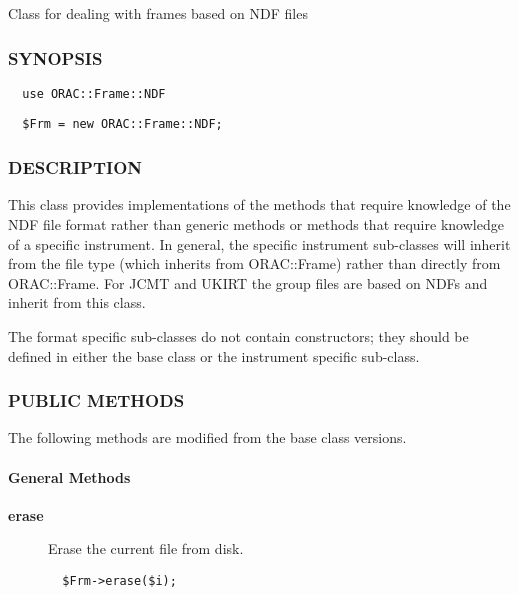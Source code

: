 \begin{description}
Class for dealing with frames based on NDF files

\subsubsection*{SYNOPSIS\label{ORAC::Frame::NDF_SYNOPSIS}}
\begin{verbatim}
  use ORAC::Frame::NDF
\end{verbatim}
\begin{verbatim}
  $Frm = new ORAC::Frame::NDF;
\end{verbatim}
\subsubsection*{DESCRIPTION\label{ORAC::Frame::NDF_DESCRIPTION}}


This class provides implementations of the methods that require
knowledge of the NDF file format rather than generic methods or
methods that require knowledge of a specific instrument.  In general,
the specific instrument sub-classes will inherit from the file type
(which inherits from ORAC::Frame) rather than directly from
ORAC::Frame. For JCMT and UKIRT the group files are based on NDFs and
inherit from this class.



The format specific sub-classes do not contain constructors; they 
should be defined in either the base class or the instrument specific
sub-class.

\subsubsection*{PUBLIC METHODS\label{ORAC::Frame::NDF_PUBLIC_METHODS}}


The following methods are modified from the base class versions.

\paragraph*{General Methods\label{ORAC::Frame::NDF_General_Methods}}
\begin{description}

\item[{\textbf{erase}}] \mbox{}

Erase the current file from disk.

\begin{verbatim}
  $Frm->erase($i);
\end{verbatim}



\end{description}
\end{description}
